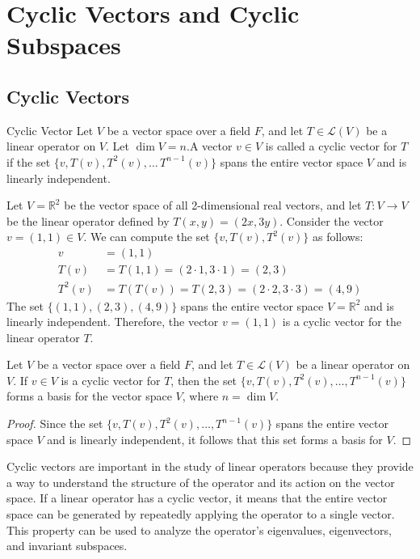 \documentclass[openany]{book}
\begin{document}
\chapter{Cyclic Vectors and Cyclic Subspaces}
\section{Cyclic Vectors}
\begin{mydefinition}{Cyclic Vector}
Let $V$ be a vector space over a field $F$, and let $T \in \mathcal{L}(V)$ be a linear operator on $V$. Let $\dim V = n$.A vector $v \in V$ is called a cyclic vector for $T$ if the set $\{v, T(v), T^2(v), \ldots\, T^{n-1}(v)\}$ spans the entire vector space $V$ and is linearly independent.
\end{mydefinition}
\begin{example}
Let $V = \mathbb{R}^2$ be the vector space of all 2-dimensional real vectors, and let $T: V \to V$ be the linear operator defined by $T(x, y) = (2x, 3y)$. Consider the vector $v = (1, 1) \in V$. We can compute the set $\{v, T(v), T^2(v)\}$ as follows:
\begin{align*}
v &= (1, 1) \\
T(v) &= T(1, 1) = (2 \cdot 1, 3 \cdot 1) = (2, 3) \\
T^2(v) &= T(T(v)) = T(2, 3) = (2 \cdot 2, 3 \cdot 3) = (4, 9)
\end{align*}
The set $\{(1, 1), (2, 3), (4, 9)\}$ spans the entire vector space $V = \mathbb{R}^2$ and is linearly independent. Therefore, the vector $v = (1, 1)$ is a cyclic vector for the linear operator $T$.
\end{example}
\begin{mytheorem}
Let $V$ be a vector space over a field $F$, and let $T \in \mathcal{L}(V)$ be a linear operator on $V$. If $v \in V$ is a cyclic vector for $T$, then the set $\{v, T(v), T^2(v), \ldots, T^{n-1}(v)\}$ forms a basis for the vector space $V$, where $n = \dim V$.
\end{mytheorem}
\begin{proof}
Since the set $\{v, T(v), T^2(v), \ldots, T^{n-1}(v)\}$ spans the entire vector space $V$ and is linearly independent, it follows that this set forms a basis for $V$.
\end{proof}
Cyclic vectors are important in the study of linear operators because they provide a way to understand the structure of the operator and its action on the vector space. If a linear operator has a cyclic vector, it means that the entire vector space can be generated by repeatedly applying the operator to a single vector. This property can be used to analyze the operator's eigenvalues, eigenvectors, and invariant subspaces. 
\end{document}
